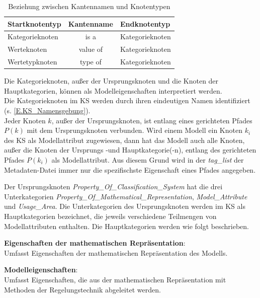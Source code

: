 \begin{table}[H]
	\centering
	\begin{tabular}{l|c|l}
		Startknotentyp & Kantenname & Endknotentyp \\ \hline
		Kategorieknoten & is a & Kategorieknoten \\
		Werteknoten & value of & Kategorieknoten \\
		Wertetypknoten & type of & Kategorieknoten 
	\end{tabular}
	\caption{Beziehung zwischen Kantennamen und Knotentypen}
	\label{table:KS_KantenUndKnoten}
\end{table}
%
Die Kategorieknoten, außer der Ursprungsknoten und die Knoten der Hauptkategorien, können als Modelleigenschaften interpretiert werden. \\
Die Kategorieknoten im KS werden durch ihren eindeutigen Namen identifiziert (s. \ref{E.KS_Namensgebung}).\\
Jeder Knoten $k$, außer der Ursprungsknoten, ist entlang eines gerichteten Pfades $P(k)$ mit dem Ursprungsknoten verbunden. Wird einem Modell ein Knoten $k_i$ des KS als Modellattribut zugewiesen, dann hat das Modell auch alle Knoten, außer die Knoten der Ursprungs -und Hauptkategorie(-n), entlang des gerichteten Pfades $P(k_i)$ als Modellattribut. Aus diesem Grund wird in der \textit{tag\_list} der Metadaten-Datei immer nur die spezifischste Eigenschaft eines Pfades angegeben. %

Der Ursprungsknoten \textit{Property\_Of\_Classification\_System} hat die drei Unterkategorien \textit{Property\_Of\_Mathematical\_Representation}, \textit{Model\_Attribute} und \textit{Usage\_Area}. Die Unterkategorien des Ursprungsknoten werden im KS als Hauptkategorien bezeichnet, die jeweils verschiedene Teilmengen von Modellattributen enthalten. Die Hauptkategorien werden wie folgt beschrieben.

\textbf{Eigenschaften der mathematischen Repräsentation}: \\
Umfasst Eigenschaften der mathematischen Repräsentation des Modells.   %

\textbf{Modelleigenschaften}: \\ %
Umfasst Eigenschaften, die aus der mathematischen Repräsentation mit Methoden der Regelungstechnik abgeleitet werden.

